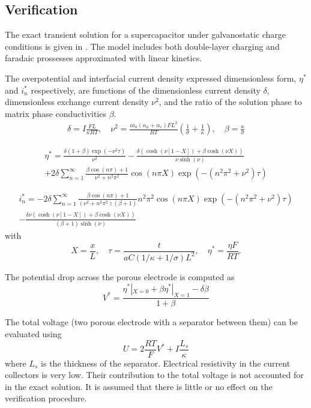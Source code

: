 \subsection{Verification}
The exact transient solution for a supercapacitor under galvanostatic charge
conditions is given in \cite{Subramanian2004}.  The model includes both
double-layer charging and faradaic prossesses approximated with linear
kinetics.

The overpotential and interfacial current density expressed dimensionless
form, $\eta^*$ and $i_n^*$ respectively, are
functions of the dimensionless current density $\delta$,
dimensionless exchange current density $\nu^2$,
and the ratio of the solution phase to matrix phase conductivities $\beta$.
\begin{align}
    \delta = I \frac{F L}{\kappa R T} , \quad
    \nu^2 = \frac{ai_0 (\alpha_a+\alpha_c) F L^2}{R T} \left( \frac{1}{\sigma} + \frac{1}{\kappa} \right) , \quad
    \beta = \frac{\kappa}{\sigma} \nonumber
\end{align}

\begin{align}
    \eta^* =
    \frac{\delta (1 + \beta) \exp(-\nu^2 \tau)}{\nu^2}
    - \frac{\delta \left( \cosh(\nu [1-X]) + \beta \cosh(\nu X) \right)}{\nu \sinh(\nu)} \nonumber \\
    + 2\delta \sum_{n=1}^{\infty} \frac{\beta \cos(n \pi) + 1}{\nu^2 + n^2 \pi^2} \cos(n \pi X) \exp(-(n^2 \pi^2 + \nu^2) \tau)
\end{align}

\begin{align}
    i_n^* =
    - 2\delta \sum_{n=1}^{\infty} \frac{\beta \cos(n \pi) + 1}{(\nu^2 + n^2
\pi^2) (\beta + 1)} n^2 \pi^2 \cos(n \pi X) \exp(-(n^2 \pi^2 + \nu^2) \tau) \nonumber \\
    - \frac{\delta \nu \left( \cosh(\nu [1-X]) + \beta \cosh(\nu X) \right)}{(\beta + 1) \sinh(\nu)}
\end{align}
with
\begin{equation}
    X = \frac{x}{L} , \quad
    \tau = \frac{t}{aC (1/\kappa + 1/\sigma) L^2} , \quad
    \eta^* = \frac{\eta F}{R T} .
\end{equation}

The potential drop across the porous electrode is computed as
\begin{equation}
    V^* =
    \frac{\eta^*|_{X=0} + \beta \eta^*|_{X=1} - \delta \beta}{1 + \beta}
\end{equation}

The total voltage (two porous electrode with a separator between them) can be
evaluated using
\begin{equation}
    U = 2 \frac{R T}{F} V^* + I \frac{L_s}{\kappa}
    \label{eq:voltage_drop_across_two_electrodes_and_separator}
\end{equation}
where $L_s$ is the thickness of the separator.  Electrical resistivity in the
current collectors is very low.  Their contribution to the total voltage is
not accounted for in the exact solution.  It is assumed that there is little
or no effect on the verification procedure.

